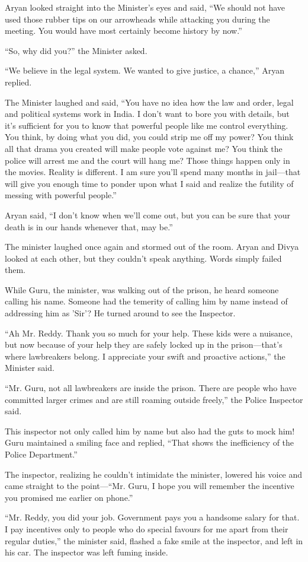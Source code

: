 Aryan looked straight into the Minister's eyes and said, “We should not have
used those rubber tips on our arrowheads while attacking you during the meeting.
You would have most certainly become history by now.”

“So, why did you?” the Minister asked.

“We believe in the legal system. We wanted to give justice, a chance,” Aryan
replied.

The Minister laughed and said, “You have no idea how the law and order, legal
and political systems work in India. I don't want to bore you with details, but
it's sufficient for you to know that powerful people like me control everything.
You think, by doing what you did, you could strip me off my power? You think all
that drama you created will make people vote against me? You think the police
will arrest me and the court will hang me? Those things happen only in the
movies. Reality is different. I am sure you'll spend many months in jail—that
will give you enough time to ponder upon what I said and realize the futility of
messing with powerful people.”

Aryan said, “I don't know when we'll come out, but you can be sure that your
death is in our hands whenever that, may be.”

The minister laughed once again and stormed out of the room. Aryan and Divya
looked at each other, but they couldn't speak anything. Words simply failed them.

While Guru, the minister, was walking out of the prison, he heard someone
calling his name. Someone had the temerity of calling him by name instead of
addressing him as 'Sir'? He turned around to see the Inspector.

“Ah Mr. Reddy. Thank you so much for your help. These kids were a nuisance, but
now because of your help they are safely locked up in the prison—that's where
lawbreakers belong. I appreciate your swift and proactive actions,” the
Minister said.

“Mr. Guru, not all lawbreakers are inside the prison. There are people who have
committed larger crimes and are still roaming outside freely,” the Police
Inspector said.

This inspector not only called him by name but also had the guts to mock him!
Guru maintained a smiling face and replied, “That shows the inefficiency of the
Police Department.”

The inspector, realizing he couldn't intimidate the minister, lowered his voice
and came straight to the point—“Mr. Guru, I hope you will remember the
incentive you promised me earlier on phone.”

“Mr. Reddy, you did your job. Government pays you a handsome salary for that. I
pay incentives only to people who do special favours for me apart from their
regular duties,” the minister said, flashed a fake smile at the inspector, and
left in his car. The inspector was left fuming inside.